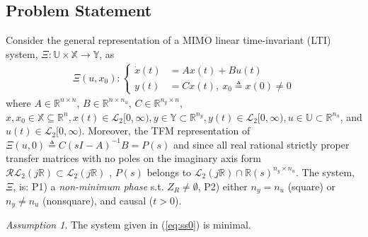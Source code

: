 \documentclass[10pt,a4paper]{amsart}
\theoremstyle{remark}
\newtheorem{assumption}{Assumption}
\begin{document}
\subsection{Problem Statement} \label{sec:problem}
Consider the general representation of a MIMO linear time-invariant (LTI) system, $\Xi: \mathbb{U} \times \mathbb{X} \to \mathbb{Y}$, as
\begin{align} \label{eq:ss0}
\Xi(u,x_0) : \begin{cases}
\dot{x}(t)&= Ax(t)+Bu(t)\\ 
 y(t)&= C x(t), \ x_0\triangleq x(0) \ne 0
\end{cases}
\end{align} 
where $A \in \mathbb{R}^{n\times n}$, $B\in \mathbb{R}^{n\times n_u}$,  $C\in \mathbb{R}^{n_y \times n}$, $x, x_0 \in \mathbb{X} \subseteq \mathbb{R}^{n}, x(t) \in \mathcal{L}_2[0,\infty),  y \in \mathbb{Y} \subset  \mathbb{R}^{n_y}, y(t) \in \mathcal{L}_2[0,\infty), u \in \mathbb{U} \subset \mathbb{R}^{n_u}$, and $u(t) \in \mathcal{L}_2[0,\infty)$. Moreover, the TFM representation of $\Xi(u,0) \triangleq C(sI-A)^{-1}B =P(s)$ and since all real rational strictly proper transfer matrices with no poles on the
imaginary axis form $\mathcal{RL}_2(j\mathbb{R}) \subset \mathcal{L}_2(j\mathbb{R})$ \cite[page 48]{zhou1998essentials}, $ P(s) $ belongs to $ \mathcal{L}_2(j\mathbb{R})\cap \mathbb{R}(s)^{n_y \times n_u}$. The system, $\Xi$, is: P1) a \textit{non-minimum phase} s.t. $Z_R \ne \emptyset$, P2) either $n_y=n_u$ (square) or $n_y \ne n_u$ (nonsquare), and causal ($t > 0 $).
\begin{assumption}\label{ass:minimalABC}
The system given in (\ref{eq:ss0}) is minimal.
\end{assumption}
\end{document}
